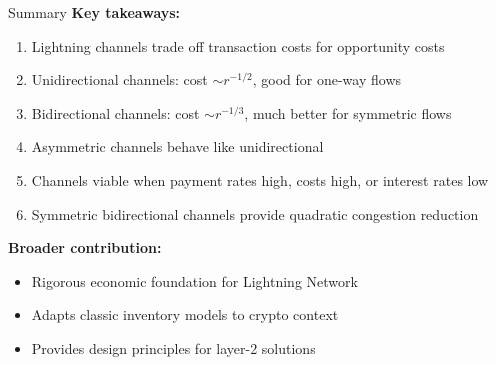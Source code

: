 \documentclass[aspectratio=169,12pt]{beamer}
\begin{document}
\begin{frame}{Summary}
\textbf{Key takeaways:}
\begin{enumerate}
    \item Lightning channels trade off transaction costs for opportunity costs
    \item Unidirectional channels: cost $\sim r^{-1/2}$, good for one-way flows
    \item Bidirectional channels: cost $\sim r^{-1/3}$, much better for symmetric flows
    \item Asymmetric channels behave like unidirectional
    \item Channels viable when payment rates high, costs high, or interest rates low
    \item Symmetric bidirectional channels provide quadratic congestion reduction
\end{enumerate}

\vspace{0.5cm}
\textbf{Broader contribution:}
\begin{itemize}
    \item Rigorous economic foundation for Lightning Network
    \item Adapts classic inventory models to crypto context
    \item Provides design principles for layer-2 solutions
\end{itemize}
\end{frame}
\end{document}
